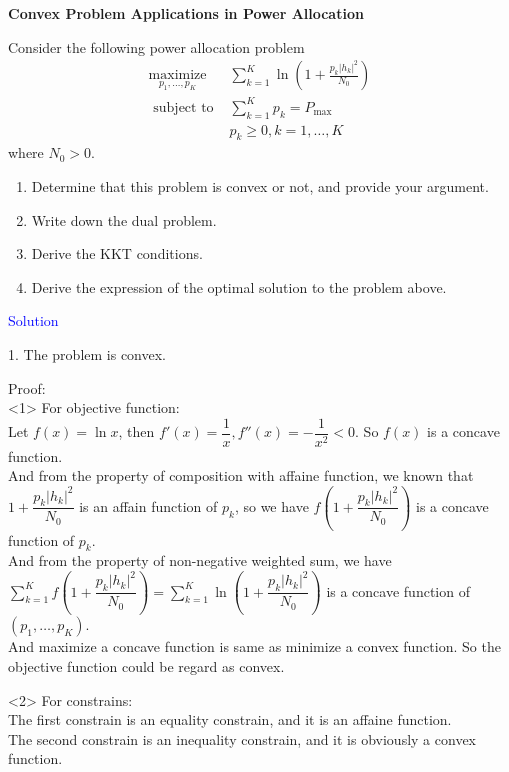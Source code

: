 \item[\uppercase\expandafter{\romannumeral5}.]\textbf{Convex Problem Applications in Power Allocation}

Consider the following power allocation problem
$$
\begin{aligned}
\underset{p_1, \ldots, p_K}{\operatorname{maximize}}\;\; & \sum_{k=1}^K \ln \left(1+\frac{p_k\left|h_k\right|^2}{N_0}\right) \\
\text { subject to } & \sum_{k=1}^K p_k=P_{\max } \\
& p_k \geq 0, k=1, \ldots, K
\end{aligned}
$$
where $N_0>0$.
\begin{enumerate}
    \item Determine that this problem is convex or not, and provide your argument. 
    \item Write down the dual problem. 
    \item Derive the KKT conditions. 
    \item Derive the expression of the optimal solution to the problem above. 
\end{enumerate}

\textcolor{blue}{Solution}

1. The problem is convex.

Proof: \\
<1> For objective function: \\
Let $f(x) = \ln x$, then $f'(x)=\dfrac{1}{x}, f''(x)=-\dfrac{1}{x^2}<0$. So $f(x)$ is a concave function. \\
And from the property of composition with affaine function, we known that $1+\dfrac{p_k|h_k|^2}{N_0}$ is an affain function of $p_k$, so we have $f\left(1+\dfrac{p_k|h_k|^2}{N_0}\right)$ is a concave function of $p_k$. \\
And from the property of non-negative weighted sum, we have $\sum\limits_{k=1}^K f\left(1+\dfrac{p_k|h_k|^2}{N_0}\right)= \sum\limits_{k=1}^K \ln \left(1+\dfrac{p_k\left|h_k\right|^2}{N_0}\right)$ is a concave function of $\left(p_1,\ldots,p_K\right)$. \\
And maximize a concave function is same as minimize a convex function. So the objective function could be regard as convex.

<2> For constrains: \\
The first constrain is an equality constrain, and it is an affaine function. \\
The second constrain is an inequality constrain, and it is obviously a convex function. \\

